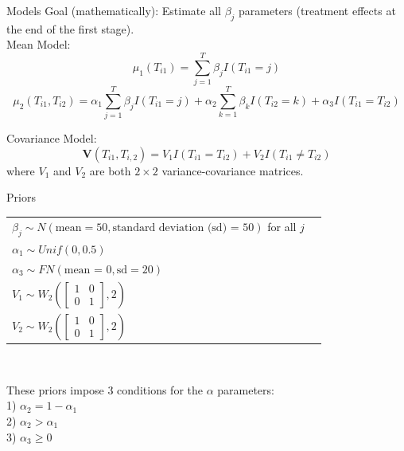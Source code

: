 \documentclass[pdftex]{beamer}
\begin{document}
\begin{frame}{Models}
Goal (mathematically): Estimate all $\beta_j$ parameters (treatment effects at the end of the first stage).\\
Mean Model:\\

$$\mu_1(T_{i1}) = \sum_{j=1}^T \beta_j I(T_{i1} = j) $$
$$\mu_2 (T_{i1}, T_{i2})  = \alpha_1 \sum_{j=1}^T \beta_{j} I(T_{i1} = j) + \alpha_2 \sum_{k=1}^T \beta_{k} I(T_{i2} = k) + \alpha_3I(T_{i1}=T_{i2}) $$ 

Covariance Model:\\
$$\mathbf{V}(T_{i1}, T_{i,2}) = V_1 I(T_{i1} = T_{i2}) + V_2  I(T_{i1} \neq T_{i2}) $$  
where $V_1$ and $V_2$ are both $2 \times 2$ variance-covariance matrices.
\end{frame}


\begin{frame}{Priors}
\begin{center}
\begin{tabular}{ll}
$\beta_j \sim  N( \text{mean} = 50, \text{standard deviation (sd) = }50) $ for all $j$ \\
$\alpha_1 \sim Unif(0,0.5)$ &  \\
$\alpha_3 \sim FN(\text{mean = }0, \text{sd} = 20)$\\
$V_1 \sim W_2\left( \begin{bmatrix}
1 & 0 \\
0 & 1
\end{bmatrix}, 2 \right)$ & \\
$V_2 \sim W_2\left( \begin{bmatrix}
1 & 0 \\
0 & 1
\end{bmatrix}, 2 \right)$ &  \\
\end{tabular}\\
\end{center}
\vspace{1em}
These priors impose 3 conditions for the $\alpha$ parameters:\\
1) $\alpha_2 =  1- \alpha_1$ \\
 2) $\alpha_2 > \alpha_1$ \\
 3) $\alpha_3 \ge 0$
\end{frame}
\end{document}
